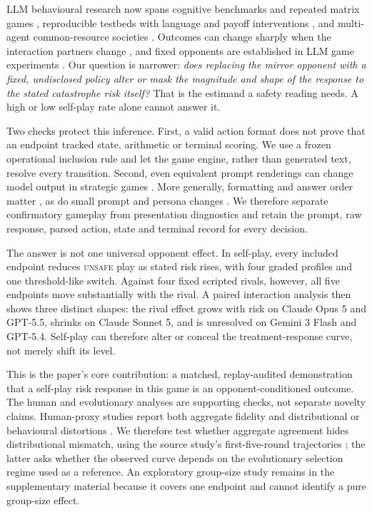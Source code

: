 \documentclass[sigconf,anonymous]{aamas}
\newcommand{\Unsafe}{\textsc{unsafe}}
\begin{document}
LLM behavioural research now spans cognitive benchmarks and repeated
matrix games \citep{codaFornoCogBench2024,playing_repeated_games_with_llms},
reproducible testbeds with language and payoff interventions
\citep{buscemiFAIRGAME2025,huynhUnderstanding2025,huynhPayoffScaling2026}, and
multi-agent common-resource societies \citep{piattiGovSim2024}. Outcomes can
change sharply when the interaction partners change
\citep{lekeasNashSuppression2026}, and fixed opponents are established in LLM
game experiments \citep{playing_repeated_games_with_llms,payneStrategicIntelligence2025}.
Our question is narrower: \emph{does replacing the mirror opponent with a fixed,
undisclosed policy alter or mask the magnitude and shape of the response to the
stated catastrophe risk itself?} That is the estimand a safety reading needs. A
high or low self-play rate alone cannot answer it.

Two checks protect this inference. First, a valid action format does not prove
that an endpoint tracked state, arithmetic or terminal scoring. We use a frozen
operational inclusion rule and let the game engine, rather than generated text,
resolve every transition. Second, even equivalent prompt renderings can change
model output in strategic games
\citep{robinsonBurdenFraming2025,mousaviDavoudiEtAl2026}. More generally,
formatting and answer order matter
\citep{sclarPromptFormatting2024,pezeshkpourOptionOrder2024,weiSelectionBias2024},
as do small prompt and persona changes
\citep{salinasButterfly2024,zhengPersona2024,herrStrategicBias2024}.
We therefore separate confirmatory gameplay from presentation diagnostics and
retain the prompt, raw response, parsed action, state and terminal record for
every decision.

The answer is not one universal opponent effect. In self-play, every included
endpoint reduces \Unsafe{} play as stated risk rises, with four graded profiles
and one threshold-like switch. Against four fixed scripted rivals, however, all
five endpoints move substantially with the rival. A paired interaction analysis
then shows three distinct shapes: the rival effect grows with risk on Claude
Opus 5 and GPT-5.5, shrinks on Claude Sonnet 5, and is unresolved on Gemini 3
Flash and GPT-5.4. Self-play can therefore alter or conceal the treatment-response
curve, not merely shift its level.

This is the paper's core contribution: a matched, replay-audited demonstration
that a self-play risk response in this game is an opponent-conditioned outcome.
The human and evolutionary analyses are supporting checks, not separate novelty
claims. Human-proxy studies report both aggregate fidelity and distributional
or behavioural distortions
\citep{using_llm_to_simulate,out_of_one,synthetic_replacement_human}. We therefore
test whether aggregate agreement hides distributional mismatch, using the source
study's first-five-round trajectories \citep{falling_behind_unsafe}; the latter asks whether
the observed curve depends on the evolutionary selection regime used as a
reference. An exploratory group-size study remains in the supplementary material
because it covers one endpoint and cannot identify a pure group-size effect.
\end{document}
